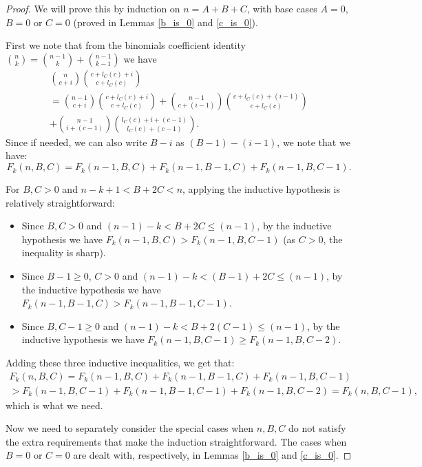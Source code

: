 \documentclass[11pt, reqno]{amsart}
\numberwithin{equation}{section}
\begin{document}
\begin{proof}
    We will prove this by induction on $n=A+B+C$, with base cases $A=0$, $B=0$ or $C=0$ (proved in Lemmas \ref{b_is_0} and \ref{c_is_0}).
    
    First we note that from the binomials coefficient identity $\binom{n}{k}=\binom{n-1}{k}+\binom{n-1}{k-1}$ we have
    \begin{multline*}
        \binom{n}{c+i}\binom{c+l_C(c)+i}{c+l_C(c)}\\
        =\binom{n-1}{c+i}\binom{c+l_C(c)+i}{c+l_C(c)}+
        \binom{n-1}{c+(i-1)}\binom{c+l_C(c)+(i-1)}{c+l_C(c)}\\+
        \binom{n-1}{i+(c-1)}\binom{l_C(c)+i+(c-1)}{l_C(c)+(c-1)}.
    \end{multline*}
    Since if needed, we can also write $B-i$ as $(B-1)-(i-1)$, we note that we have:
    \begin{equation}
        F_k(n, B, C)=F_k(n-1, B, C)+F_k(n-1, B-1, C)+F_k(n-1, B, C-1).
    \end{equation}

    For $B, C>0$ and $n-k+1 < B+2C < n$, applying the inductive hypothesis is relatively straightforward:
    \begin{itemize}
        \item Since $B, C > 0$ and $(n-1) -k < B+2C \leqslant (n-1)$, by the inductive hypothesis we have $F_k(n-1, B, C)>F_k(n-1, B, C-1)$ (as $C>0$, the inequality is sharp).
        \item Since $B-1 \geqslant 0$, $C>0$ and $(n-1) - k < (B-1)+2C \leqslant (n-1)$, by the inductive hypothesis we have $F_k(n-1, B-1, C)>F_k(n-1, B-1, C-1)$.
        \item Since $B, C-1 \geqslant 0$ and $(n-1) -k < B+2(C-1) \leqslant (n-1)$, by the inductive hypothesis we have $F_k(n-1, B, C-1) \geqslant F_k(n-1, B, C-2)$.
    \end{itemize}
    Adding these three inductive inequalities, we get that:
    \begin{multline*}
        F_k(n, B, C)=F_k(n-1, B, C)+F_k(n-1, B-1, C)+F_k(n-1, B, C-1)\\
        > F_k(n-1, B, C-1)+F_k(n-1, B-1, C-1)+F_k(n-1, B, C-2) = F_k(n, B, C-1),
    \end{multline*}
    which is what we need.

    Now we need to separately consider the special cases when $n, B, C$ do not satisfy the extra requirements that make the induction straightforward. The cases when $B=0$ or $C=0$ are dealt with, respectively, in Lemmas \ref{b_is_0} and \ref{c_is_0}.


\end{proof}
\end{document}
